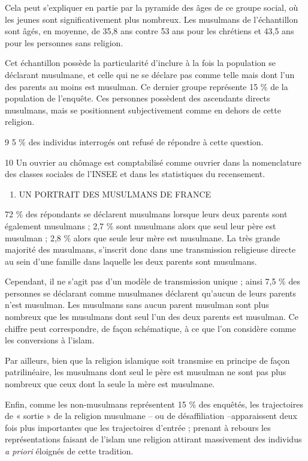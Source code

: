 Cela peut s'expliquer en partie par la pyramide des âges de ce groupe
social, où les jeunes sont significativement plus nombreux. Les
musulmans de l'échantillon sont âgés, en moyenne, de 35,8 ans contre 53
ans pour les chrétiens et 43,5 ans pour les personnes sans religion.

Cet échantillon possède la particularité d'inclure à la fois la
population se déclarant musulmane, et celle qui ne se déclare pas comme
telle mais dont l'un des parents au moins est musulman. Ce dernier
groupe représente 15 \% de la population de l'enquête. Ces personnes
possèdent des ascendants directs musulmans, mais se positionnent
subjectivement comme en dehors de cette religion.

9 5 \% des individus interrogés ont refusé de répondre à cette question.

10 Un ouvrier au chômage est comptabilisé comme ouvrier dans la
nomenclature des classes sociales de l'INSEE et dans les statistiques du
recensement.


\begin{enumerate}
\def\labelenumi{\Roman{enumi}.}
\item
  UN PORTRAIT DES MUSULMANS DE FRANCE
\end{enumerate}


72 \% des répondants se déclarent musulmans lorsque leurs deux parents
sont également musulmans ; 2,7 \% sont musulmans alors que seul leur
père est musulman ; 2,8 \% alors que seule leur mère est musulmane. La
très grande majorité des musulmans, s'inscrit donc dans une transmission
religieuse directe au sein d'une famille dans laquelle les deux parents
sont musulmans.

Cependant, il ne s'agit pas d'un modèle de transmission unique ; ainsi
7,5 \% des personnes se déclarant comme musulmanes déclarent qu'aucun de
leurs parents n'est musulman. Les musulmans sans aucun parent musulman
sont plus nombreux que les musulmans dont seul l'un des deux parents est
musulman. Ce chiffre peut correspondre, de façon schématique, à ce que
l'on considère comme les conversions à l'islam.

Par ailleurs, bien que la religion islamique soit transmise en principe
de façon patrilinéaire, les musulmans dont seul le père est musulman ne
sont pas plus nombreux que ceux dont la seule la mère est musulmane.

Enfin, comme les non-musulmans représentent 15 \% des enquêtés, les
trajectoires de « sortie » de la religion musulmane -- ou de
désaffiliation --apparaissent deux fois plus importantes que les
trajectoires d'entrée ; prenant à rebours les représentations faisant de
l'islam une religion attirant massivement des individus \emph{a priori}
éloignés de cette tradition.

